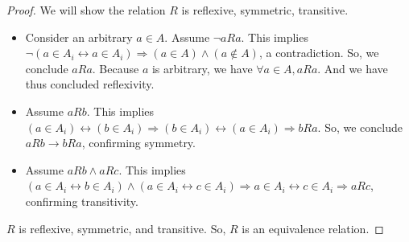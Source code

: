 \documentclass[11pt]{article}
\theoremstyle{definition}
\begin{document}
\begin{proof}
We will show the relation $R$ is reflexive, symmetric, transitive.
\begin{itemize}
    \item Consider an arbitrary $a \in A$. Assume $\lnot aRa$. This implies $\lnot(a \in A_i \leftrightarrow a \in A_i) \Rightarrow (a \in A) \land (a \notin A)$, a contradiction. So, we conclude $aRa$. Because $a$ is arbitrary, we have $\forall a \in A, aRa$. And we have thus concluded reflexivity.
    \item Assume $aRb$. This implies $(a \in A_i) \leftrightarrow (b \in
        A_i) \Rightarrow (b \in A_i) \leftrightarrow (a \in A_i)
        \Rightarrow bRa$. So, we conclude $aRb \rightarrow bRa$, confirming
        symmetry.
    \item Assume $aRb \land aRc$. This implies $(a \in A_i \leftrightarrow b \in A_i) \land (a \in A_i \leftrightarrow c \in A_i) \Rightarrow a \in A_i \leftrightarrow c \in A_i \Rightarrow aRc$, confirming transitivity.
\end{itemize}
$R$ is reflexive, symmetric, and transitive. So, $R$ is an equivalence relation.
\end{proof}
\end{document}

